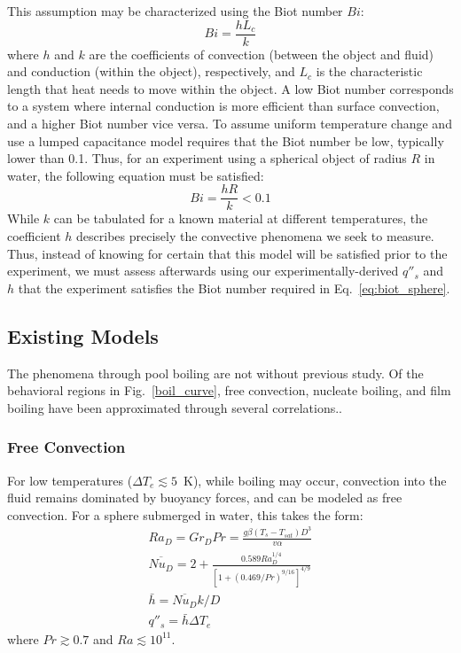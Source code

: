\documentclass[12pt]{article}
\newcommand{\Te}{\Delta T_e}
\newcommand{\figref}[1]{Fig.~\ref{#1}}
\begin{document}
This assumption may be characterized using the Biot number $Bi$:
\begin{equation}
    Bi=\frac{hL_c}{k}
    \label{eq:biot}
\end{equation}
where $h$ and $k$ are the coefficients of convection (between the object and fluid) and conduction (within the object), respectively, and $L_c$ is the characteristic length that heat needs to move within the object.
A low Biot number corresponds to a system where internal conduction is more efficient than surface convection, and a higher Biot number vice versa.
To assume uniform temperature change and use a lumped capacitance model requires that the Biot number be low, typically lower than 0.1.
Thus, for an experiment using a spherical object of radius $R$ in water, the following equation must be satisfied:
\begin{equation}
    Bi=\frac{hR}{k}<0.1
    \label{eq:biot_sphere}
\end{equation}
While $k$ can be tabulated for a known material at different temperatures, the coefficient $h$ describes precisely the convective phenomena we seek to measure.
Thus, instead of knowing for certain that this model will be satisfied prior to the experiment, we must assess afterwards using our experimentally-derived $q''_s$ and $h$ that the experiment satisfies the Biot number required in Eq.~\ref{eq:biot_sphere}.

\subsection{Existing Models}
The phenomena through pool boiling are not without previous study.
Of the behavioral regions in \figref{boil_curve}, free convection, nucleate boiling, and film boiling have been approximated through several correlations.\cite{bergman_fundamentals_2017}.\\

\subsubsection{Free Convection}
For low temperatures ($\Te \lesssim 5$~K), while boiling may occur, convection into the fluid remains dominated by buoyancy forces, and can be modeled as free convection.
For a sphere submerged in water, this takes the form\cite{bergman_fundamentals_2017}:
\begin{equation}
    \begin{gathered}
        Ra_D = Gr_DPr = \frac{g\beta(T_s-T_{sat})D^3}{v\alpha}\\
        \overline{Nu_D}= 2+\frac{0.589 Ra_D^{1/4}}{\left[1+(0.469/Pr)^{9/16}\right]^{4/9}}\\
        \bar{h} = \overline{Nu_D}k/D\\
        q''_s=\bar{h}\Te
    \end{gathered}
    \label{eq:free_boil}
\end{equation}
where $Pr\gtrsim0.7$ and $Ra\lesssim10^{11}$.
\end{document}
